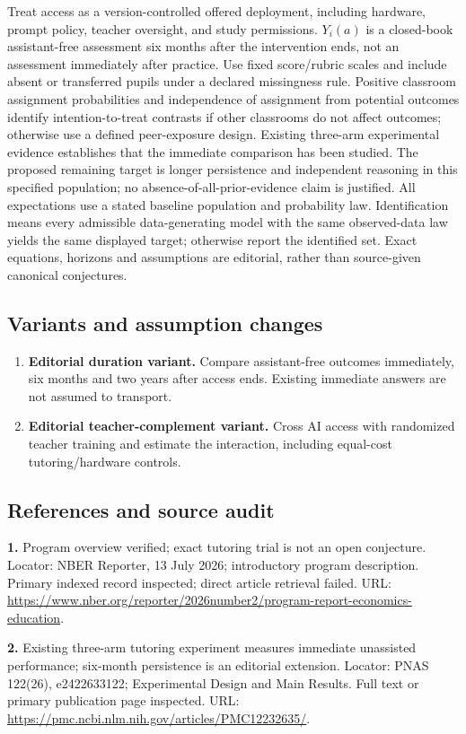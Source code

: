 \documentclass[11pt,a4paper]{article}
\begin{document}
Treat access as a version-controlled offered deployment, including hardware, prompt policy, teacher oversight, and study permissions. \(Y_i(a)\) is a closed-book assistant-free assessment six months after the intervention ends, not an assessment immediately after practice. Use fixed score/rubric scales and include absent or transferred pupils under a declared missingness rule. Positive classroom assignment probabilities and independence of assignment from potential outcomes identify intention-to-treat contrasts if other classrooms do not affect outcomes; otherwise use a defined peer-exposure design. Existing three-arm experimental evidence establishes that the immediate comparison has been studied. The proposed remaining target is longer persistence and independent reasoning in this specified population; no absence-of-all-prior-evidence claim is justified. All expectations use a stated baseline population and probability law. Identification means every admissible data-generating model with the same observed-data law yields the same displayed target; otherwise report the identified set. Exact equations, horizons and assumptions are editorial, rather than source-given canonical conjectures.
\subsection*{Variants and assumption changes}
\begin{enumerate}
\item \textbf{Editorial duration variant.} Compare assistant-free outcomes immediately, six months and two years after access ends. Existing immediate answers are not assumed to transport.
\item \textbf{Editorial teacher-complement variant.} Cross AI access with randomized teacher training and estimate the interaction, including equal-cost tutoring/hardware controls.
\end{enumerate}
\subsection*{References and source audit}
\textbf{1.} Program overview verified; exact tutoring trial is not an open conjecture. Locator: NBER Reporter, 13 July 2026; introductory program description. Primary indexed record inspected; direct article retrieval failed. URL: \url{https://www.nber.org/reporter/2026number2/program-report-economics-education}.

\textbf{2.} Existing three-arm tutoring experiment measures immediate unassisted performance; six-month persistence is an editorial extension. Locator: PNAS 122(26), e2422633122; Experimental Design and Main Results. Full text or primary publication page inspected. URL: \url{https://pmc.ncbi.nlm.nih.gov/articles/PMC12232635/}.
\end{document}
